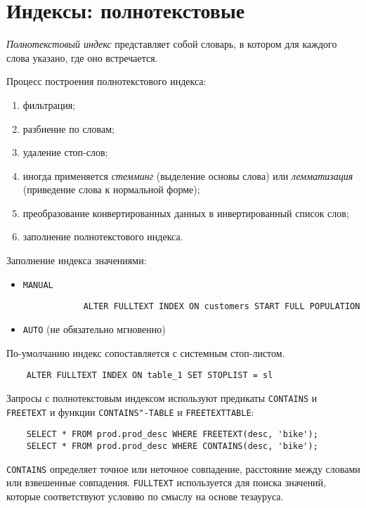 \section{Индексы: полнотекстовые}

\begin{definition}
	\emph{Полнотекстовый индекс} представляет собой словарь, в котором для каждого слова указано, где оно встречается.
\end{definition}

Процесс построения полнотекстового индекса:
\begin{enumerate}
	\item фильтрация;
	\item разбиение по словам;
	\item удаление стоп-слов;
	\item иногда применяется \emph{стемминг} (выделение основы слова) или \emph{лемматизация} (приведение слова к нормальной форме);
	\item преобразование конвертированных данных в инвертированный список слов;
	\item заполнение полнотекстового индекса.
\end{enumerate}

Заполнение индекса значениями:
\begin{itemize}
	\item \texttt{MANUAL}
		\begin{verbatim}
			ALTER FULLTEXT INDEX ON customers START FULL POPULATION
		\end{verbatim}
	\item \texttt{AUTO} (не обязательно мгновенно)
\end{itemize}

По-умолчанию индекс сопоставляется с системным стоп-листом.
\begin{verbatim}
	ALTER FULLTEXT INDEX ON table_1 SET STOPLIST = sl
\end{verbatim}

Запросы с полнотекстовым индексом используют предикаты \texttt{CONTAINS} и \texttt{FREETEXT} и функции \texttt{CONTAINS"-TABLE} и \texttt{FREETEXTTABLE}:
\begin{verbatim}
	SELECT * FROM prod.prod_desc WHERE FREETEXT(desc, 'bike');
	SELECT * FROM prod.prod_desc WHERE CONTAINS(desc, 'bike');
\end{verbatim}

\texttt{CONTAINS} определяет точное или неточное совпадение, расстояние между словами или взвешенные совпадения.
\texttt{FULLTEXT} используется для поиска значений, которые соответствуют условию по смыслу на основе тезауруса.

